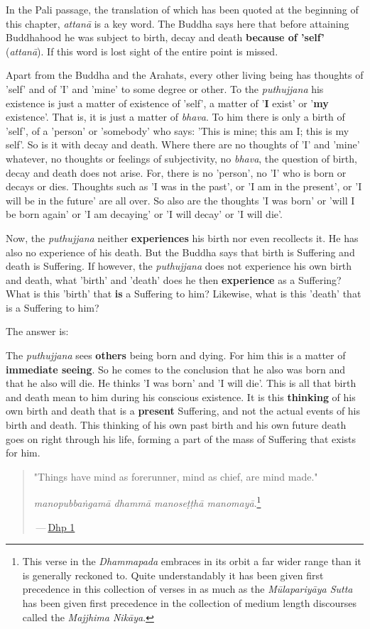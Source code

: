 In the Pali passage, the translation of which has been quoted at the
beginning of this chapter, \emph{attanā} is a key word. The Buddha says here
that before attaining Buddhahood he was subject to birth, decay and
death \textbf{because of 'self'} (\emph{attanā}). If this word is lost sight of
the entire point is missed.


Apart from the Buddha and the Arahats, every other living being has
thoughts of 'self' and of 'I' and 'mine' to some degree or other. To the
\emph{puthujjana} his existence is just a matter of existence of 'self', a
matter of '\textbf{I} exist' or '\textbf{my} existence'. That is, it is just a
matter of \emph{bhava}. To him there is only a birth of 'self', of a
'person' or 'somebody' who says: 'This is mine; this am I; this is my
self'. So is it with decay and death. Where there are no thoughts of 'I'
and 'mine' whatever, no thoughts or feelings of subjectivity, no
\emph{bhava}, the question of birth, decay and death does not arise. For,
there is no 'person', no 'I' who is born or decays or dies. Thoughts
such as 'I was in the past', or 'I am in the present', or 'I will be in
the future' are all over. So also are the thoughts 'I was born' or 'will
I be born again' or 'I am decaying' or 'I will decay' or 'I will die'.


Now, the \emph{puthujjana} neither \textbf{experiences} his birth nor even
recollects it. He has also no experience of his death. But the Buddha
says that birth is Suffering and death is Suffering. If however, the
\emph{puthujjana} does not experience his own birth and death, what 'birth'
and 'death' does he then \textbf{experience} as a Suffering? What is this
'birth' that \textbf{is} a Suffering to him? Likewise, what is this 'death'
that is a Suffering to him?


The answer is:


The \emph{puthujjana} sees \textbf{others} being born and dying. For him this is a
matter of \textbf{immediate seeing}. So he comes to the conclusion that he
also was born and that he also will die. He thinks 'I was born' and 'I
will die'. This is all that birth and death mean to him during his
conscious existence. It is this \textbf{thinking} of his own birth and death
that is a \textbf{present} Suffering, and not the actual events of his birth
and death. This thinking of his own past birth and his own future death
goes on right through his life, forming a part of the mass of Suffering
that exists for him.


\begin{quotation}
"Things have mind as forerunner, mind as chief, are mind made."


\emph{manopubbaṅgamā dhammā manoseṭṭhā manomayā}.\footnote{This verse in the \emph{Dhammapada} embraces in its orbit a far wider range than it is generally reckoned to. Quite understandably it has been given first precedence in this collection of verses in as much as the \emph{Mūlapariyāya Sutta} has been given first precedence in the collection of medium length discourses called the \emph{Majjhima Nikāya}.}


 — \href{https://suttacentral.net/dhp1-20/en/anandajoti}{Dhp 1}


\end{quotation}

